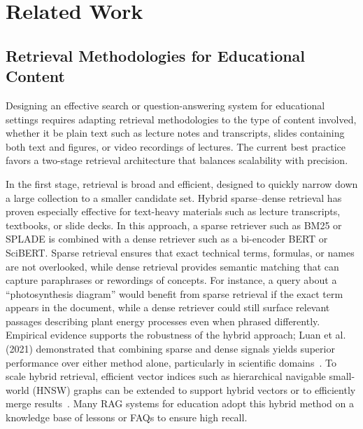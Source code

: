 \chapter{Related Work}

\section{Retrieval Methodologies for Educational Content}
\label{sec:retrieval-methodologies}
 
Designing an effective search or question-answering system for educational settings requires adapting retrieval methodologies to the type of content involved, whether it be plain text such as lecture notes and transcripts, slides containing both text and figures, or video recordings of lectures. The current best practice favors a two-stage retrieval architecture that balances scalability with precision.

In the first stage, retrieval is broad and efficient, designed to quickly narrow down a large collection to a smaller candidate set. Hybrid sparse–dense retrieval has proven especially effective for text-heavy materials such as lecture transcripts, textbooks, or slide decks. In this approach, a sparse retriever such as BM25 or SPLADE is combined with a dense retriever such as a bi-encoder BERT or SciBERT. Sparse retrieval ensures that exact technical terms, formulas, or names are not overlooked, while dense retrieval provides semantic matching that can capture paraphrases or rewordings of concepts. For instance, a query about a ``photosynthesis diagram'' would benefit from sparse retrieval if the exact term appears in the document, while a dense retriever could still surface relevant passages describing plant energy processes even when phrased differently. Empirical evidence supports the robustness of the hybrid approach; Luan et al. (2021) demonstrated that combining sparse and dense signals yields superior performance over either method alone, particularly in scientific domains~\cite{luan2021sparse_dense}. To scale hybrid retrieval, efficient vector indices such as hierarchical navigable small-world (HNSW) graphs can be extended to support hybrid vectors or to efficiently merge results~\cite{lin2021densifying}. Many RAG systems for education adopt this hybrid method on a knowledge base of lessons or FAQs to ensure high recall.

